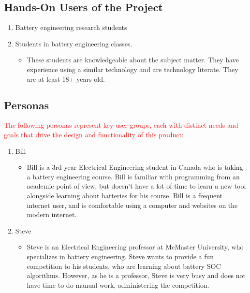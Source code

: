 \documentclass[12pt]{article}
\begin{document}
\subsection{Hands-On Users of the Project}

\begin{enumerate}
    \item Battery engineering research students
    \item Students in battery engineering classes.
    \begin{itemize}
        \item These students are knowledgeable about the subject matter. They have experience using a similar technology and are technology literate. They are at least 18+ years old.
    \end{itemize}
\end{enumerate}

\subsection{Personas}

\textcolor{red}{The following personas represent key user groups, each with distinct needs and goals that drive the design and functionality of this product:}
\begin{enumerate}
    \item Bill
    \begin{itemize}
        \item Bill is a 3rd year Electrical Engineering student in Canada who is taking a battery engineering course. Bill is familiar with programming from an academic point of view, but doesn’t have a lot of time to learn a new tool alongside learning about batteries for his course. Bill is a frequent internet user, and is comfortable using a computer and websites on the modern internet.
    \end{itemize}
    \item Steve
    \begin{itemize}
        \item Steve is an Electrical Engineering professor at McMaster University, who specializes in battery engineering. Steve wants to provide a fun competition to his students, who are learning about battery SOC algorithms. However, as he is a professor, Steve is very busy and does not have time to do manual work, administering the competition.
    \end{itemize}
\end{enumerate}
\end{document}
